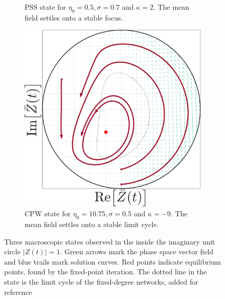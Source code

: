 \begin{figure}[H]
\begin{subfigure}[b]{0.32\linewidth}
   \caption{PSS state for $\eta_0 = 0.5, \sigma = 0.7$ and $\kappa= 2$. The mean field settles onto a stable focus.}
   \label{fig:MFOARPSS_scalefree}
\end{subfigure} \hfill
\begin{subfigure}[b]{0.32\linewidth}
   \centering
  \includegraphics[width=\linewidth]{../Figures/PhaseSpace/MFOARCPW_scalefree.pdf}
   \caption{CPW state for $\eta_0 = 10.75, \sigma = 0.5$ and $\kappa= -9$. The mean field settles onto a stable limit cycle.}
   \label{fig:MFOARCPW_scalefree}
\end{subfigure}
   \caption{Three macroscopic states observed in the \MFR inside the imaginary unit circle $|Z(t)| = 1$. Green arrows mark the phase space vector field and blue trails mark solution curves. Red points indicate equilibrium points, found by the fixed-point iteration. The dotted line in the \CPW state is the limit cycle of the fixed-degree networks, added for reference}
   \label{fig:macroscopicstatesscalefreenetworks}
\end{figure}

